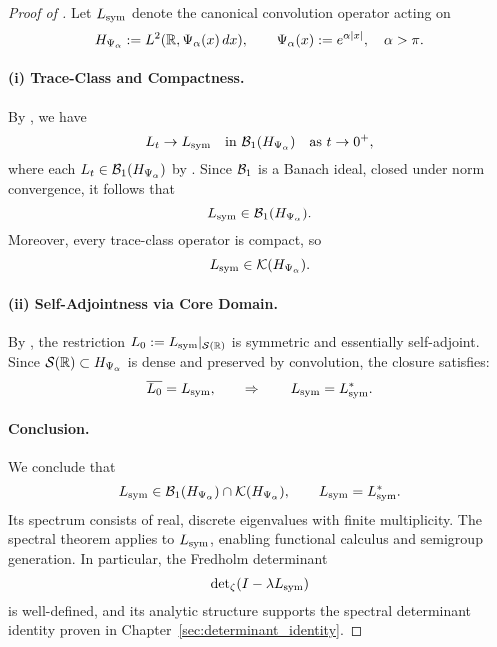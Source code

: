 \begin{proof}[Proof of ]
Let \( L_{\mathrm{sym}} \) denote the canonical convolution operator acting on
\[
H_{\Psi_\alpha} := L^2(\mathbb{R}, \Psi_\alpha(x)\, dx), \qquad \Psi_\alpha(x) := e^{\alpha |x|}, \quad \alpha > \pi.
\]

\paragraph{(i) Trace-Class and Compactness.}
By , we have
\[
L_t \to L_{\mathrm{sym}} \quad \text{in } \mathcal{B}_1(H_{\Psi_\alpha}) \quad \text{as } t \to 0^+,
\]
where each \( L_t \in \mathcal{B}_1(H_{\Psi_\alpha}) \) by . Since \( \mathcal{B}_1 \) is a Banach ideal, closed under norm convergence, it follows that
\[
L_{\mathrm{sym}} \in \mathcal{B}_1(H_{\Psi_\alpha}).
\]
Moreover, every trace-class operator is compact, so
\[
L_{\mathrm{sym}} \in \mathcal{K}(H_{\Psi_\alpha}).
\]

\paragraph{(ii) Self-Adjointness via Core Domain.}
By , the restriction \( L_0 := L_{\mathrm{sym}}|_{\mathcal{S}(\mathbb{R})} \) is symmetric and essentially self-adjoint. Since \( \mathcal{S}(\mathbb{R}) \subset H_{\Psi_\alpha} \) is dense and preserved by convolution, the closure satisfies:
\[
\overline{L_0} = L_{\mathrm{sym}}, \qquad \Rightarrow \qquad L_{\mathrm{sym}} = L_{\mathrm{sym}}^*.
\]

\paragraph{Conclusion.}
We conclude that
\[
L_{\mathrm{sym}} \in \mathcal{B}_1(H_{\Psi_\alpha}) \cap \mathcal{K}(H_{\Psi_\alpha}), \qquad L_{\mathrm{sym}} = L_{\mathrm{sym}}^*.
\]
Its spectrum consists of real, discrete eigenvalues with finite multiplicity. The spectral theorem applies to \( L_{\mathrm{sym}} \), enabling functional calculus and semigroup generation. In particular, the Fredholm determinant
\[
\det\nolimits_\zeta(I - \lambda L_{\mathrm{sym}})
\]
is well-defined, and its analytic structure supports the spectral determinant identity proven in Chapter~\ref{sec:determinant_identity}.
\end{proof}
